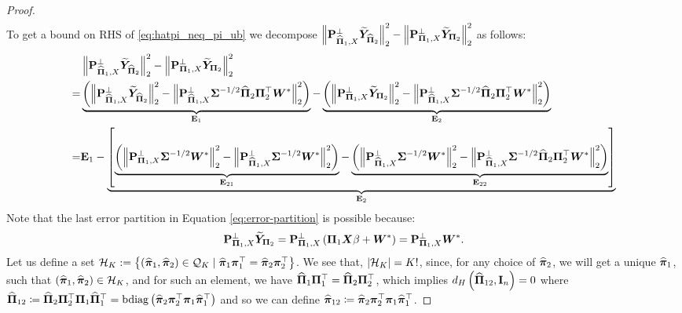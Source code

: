 \documentclass[numsec,webpdf,modern,medium,namedate]{oup-authoring-template}
\theoremstyle{thmstyleone}%
\theoremstyle{thmstyletwo}%
\theoremstyle{thmstylethree}%
\begin{document}
\begin{proof}
{\begin{eqnarray}
    \end{eqnarray}}
    To get a bound on RHS of \eqref{eq:hatpi_neq_pi_ub} we decompose $\left\|\bP_{\hatPi_1, X}^\perp \widetilde{\bY}_{\hatPi_2}\right\|_2^2 - \left\|\bP_{\bPi_1, X}^\perp \widetilde{\bY}_{\bPi_2}\right\|_2^2$ as follows:
    {\scriptsize
    \begin{equation}\label{eq:error-partition}
        \begin{split}
            & \left\|\bP_{\hatPi_1, X}^\perp \widetilde{\bY}_{\hatPi_2}\right\|_2^2 - \left\|\bP_{\bPi_1, X}^\perp \widetilde{\bY}_{\bPi_2}\right\|_2^2\\
            = & \underbrace{\left(\left\|\bP_{\hatPi_1, X}^\perp \widetilde{\bY}_{\hatPi_2}\right\|_2^2 - \left\|\bP_{\hatPi_1, X}^\perp {\bSig}^{-1/2} \hatPi_2 {\bPi}_2^\top \bW^\ast\right\|_2^2\right)}_{\bE_1} 
         - \underbrace{\left( \left\|\bP_{\bPi_1, X}^\perp \widetilde{\bY}_{\bPi_2}\right\|_2^2 - \left\|\bP_{\hatPi_1, X}^\perp {\bSig}^{-1/2} \hatPi_2 {\bPi}_2^\top \bW^\ast\right\|_2^2\right)}_{\bE_{2}}\\
         = & \bE_1 - \underbrace{\left[\underbrace{
        \left( \left\| \bP_{{\bPi}_1, X}^\perp {\bSig}^{-1/2} \bW^\ast \right\|_2^2 
        - \left\| \bP_{\hatPi_1, X}^\perp {\bSig}^{-1/2} \bW^\ast \right\|_2^2 \right)}_{\bE_{21}} 
        - \underbrace{
        \left( \left\| \bP_{\hatPi_1, X}^\perp {\bSig}^{-1/2} \bW^\ast \right\|_2^2 
        - \left\| \bP_{\hatPi_1, X}^\perp {\bSig}^{-1/2} \hatPi_2 {\bPi}_2^\top \bW^\ast \right\|_2^2 \right)}_{\bE_{22}}\right]}_{\bE_2}
        \end{split}
    \end{equation}}
Note that the last error partition in Equation \ref{eq:error-partition} is possible because:
$$
\bP_{\bPi_1, X}^\perp \widetilde{\bY}_{\bPi_2} = \bP_{\bPi_1, X}^\perp \left(\bPi_1 \bX \beta + \bW^\ast\right) =  \bP_{\bPi_1, X}^\perp\bW^\ast.
$$
Let us define a set $\calH_K := \left\{ \left( \hatpi_1, \hatpi_2 \right) \in \calQ_K \mid  \hatpi_1 \bpi_1^\top =  \hatpi_2 \bpi_2^\top \right\}$. We see that, $\left|\calH_K\right| = K!$, since, for any choice of $\hatpi_2$, we will get a unique $\hatpi_1$, such that  $(\hatpi_1, \hatpi_2 ) \in \calH_K$, and for such an element, we have $\hatPi_1 \bPi_1^\top =  \hatPi_2 \bPi_2^\top$, which implies $d_H\left(\hatPi_{12},\bI_n\right) = 0$ where $\hatPi_{12}\coloneq \hatPi_2\bPi_2^\top\bPi_1 \hatPi_1^\top = \bdiag\left(\hatpi_2\bpi_2^\top\bpi_1 \hatpi_1^\top\right)$ and so we can define $\hatpi_{12} \coloneq \hatpi_2\bpi_2^\top\bpi_1 \hatpi_1^\top$. 


\end{proof}
\end{document}
